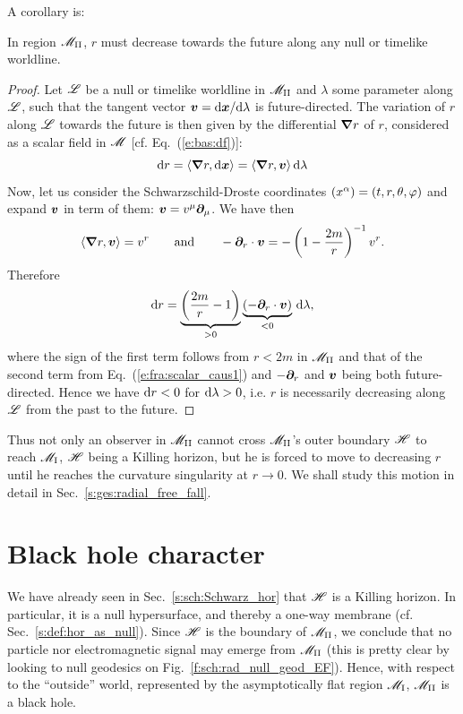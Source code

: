 A corollary is:
\begin{greybox}
In region $\mathscr{M}_{\rm II}$, $r$ must decrease towards the future
along any null or timelike worldline.
\end{greybox}
\begin{proof}
Let $\mathscr{L}$ be a null or timelike worldline in $\mathscr{M}_{\rm II}$
and $\lambda$ some parameter along $\mathscr{L}$, such that the tangent vector
$\bm{v} = \mathrm{d}\bm{x}/\mathrm{d}\lambda$ is future-directed.
The variation of $r$ along $\mathscr{L}$ towards the future is then given
by the differential $\bm{\nabla} r$ of $r$, considered as a scalar field in $\mathscr{M}$
[cf. Eq.~(\ref{e:bas:df})]:
\[
    \mathrm{d} r = \langle \bm{\nabla} r, \mathrm{d}\bm{x} \rangle = \langle \bm{\nabla} r, \bm{v} \rangle
        \, \mathrm{d} \lambda
\]
Now, let us consider the Schwarzschild-Droste coordinates
$(x^\alpha) = (t,r,\theta,\varphi)$ and expand $\bm{v}$ in term of them:
$\bm{v} = v^\mu \bm{\partial}_\mu$. We have then
\[
     \langle \bm{\nabla} r, \bm{v} \rangle = v^r
    \qquad\mbox{and}\qquad
    - \bm{\partial}_r \cdot \bm{v} = - \left(1 - \frac{2m}{r} \right)^{-1} v^r .
\]
Therefore
\[
    \mathrm{d} r = \underbrace{\left( \frac{2m}{r} -  1\right)}_{>0}
        \underbrace{(- \bm{\partial}_r \cdot \bm{v})}_{<0}
        \,  \mathrm{d}\lambda ,
\]
where the sign of the first term follows from $r<2m$ in $\mathscr{M}_{\rm II}$
and that of the second term from
Eq.~(\ref{e:fra:scalar_caus1}) and $-\bm{\partial}_r$ and $\bm{v}$ being both future-directed.
Hence we have $\mathrm{d} r < 0$ for $\mathrm{d}\lambda > 0$, i.e. $r$ is necessarily decreasing
along $\mathscr{L}$ from the past to the future.
\end{proof}
Thus not only an observer in $\mathscr{M}_{\rm II}$ cannot cross $\mathscr{M}_{\rm II}$'s outer boundary
$\mathscr{H}$ to reach $\mathscr{M}_{\rm I}$, $\mathscr{H}$ being a Killing horizon, but he is forced
to move to decreasing $r$ until he reaches the curvature singularity at $r\rightarrow 0$.
We shall study this motion in detail in Sec.~\ref{s:ges:radial_free_fall}.



\section{Black hole character} \label{s:sch:BH}

We have already seen in Sec.~\ref{s:sch:Schwarz_hor} that $\mathscr{H}$ is
a Killing horizon. In particular, it is a null hypersurface, and thereby a
one-way membrane (cf. Sec.~\ref{s:def:hor_as_null}).
Since $\mathscr{H}$ is the boundary of $\mathscr{M}_{\rm II}$, we conclude that no particle nor
electromagnetic signal may emerge from $\mathscr{M}_{\rm II}$
(this is pretty clear by looking to null geodesics on
Fig.~\ref{f:sch:rad_null_geod_EF}). Hence, with respect to the ``outside''
world, represented by the asymptotically flat region $\mathscr{M}_{\rm I}$,
$\mathscr{M}_{\rm II}$ is a black hole.

